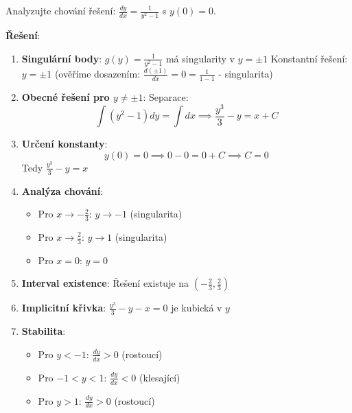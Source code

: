 \vspace{0.6\baselineskip}

\begin{example}
    Analyzujte chování řešení: $\frac{dy}{dx} = \frac{1}{y^2 - 1}$ s $y(0) = 0$.
    
    \vspace{0.3\baselineskip}
    
    \textbf{Řešení}: 
    \begin{enumerate}
    \item \textbf{Singulární body}: $g(y) = \frac{1}{y^2 - 1}$ má singularity v $y = \pm 1$
    Konstantní řešení: $y = \pm 1$ (ověříme dosazením: $\frac{d(\pm 1)}{dx} = 0 = \frac{1}{1-1}$ - singularita)
    
    \item \textbf{Obecné řešení pro $y \neq \pm 1$}: Separace:
    \[
    \int (y^2 - 1) dy = \int dx \implies \frac{y^3}{3} - y = x + C
    \]
    
    \item \textbf{Určení konstanty}:
    \[
    y(0) = 0 \implies 0 - 0 = 0 + C \implies C = 0
    \]
    Tedy $\frac{y^3}{3} - y = x$
    
    \item \textbf{Analýza chování}:
    \begin{itemize}
    \item Pro $x \to -\frac{2}{3}$: $y \to -1$ (singularita)
    \item Pro $x \to \frac{2}{3}$: $y \to 1$ (singularita)
    \item Pro $x = 0$: $y = 0$
    \end{itemize}
    
    \item \textbf{Interval existence}: Řešení existuje na $(-\frac{2}{3}, \frac{2}{3})$
    
    \item \textbf{Implicitní křivka}: $\frac{y^3}{3} - y - x = 0$ je kubická v $y$
    
    \item \textbf{Stabilita}: 
    \begin{itemize}
    \item Pro $y < -1$: $\frac{dy}{dx} > 0$ (rostoucí)
    \item Pro $-1 < y < 1$: $\frac{dy}{dx} < 0$ (klesající)  
    \item Pro $y > 1$: $\frac{dy}{dx} > 0$ (rostoucí)
    \end{itemize}
    \end{enumerate}
    \end{example}

